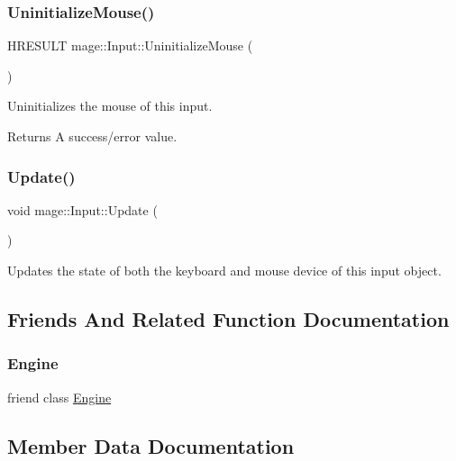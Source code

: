 \subsubsection{\texorpdfstring{Uninitialize\+Mouse()}{UninitializeMouse()}}
{\footnotesize\ttfamily H\+R\+E\+S\+U\+LT mage\+::\+Input\+::\+Uninitialize\+Mouse (\begin{DoxyParamCaption}{ }\end{DoxyParamCaption})\hspace{0.3cm}{\ttfamily [protected]}}

Uninitializes the mouse of this input.

\begin{DoxyReturn}{Returns}
A success/error value. 
\end{DoxyReturn}
\hypertarget{classmage_1_1_input_ab152509540c3f41d337296edc2aea660}{}\label{classmage_1_1_input_ab152509540c3f41d337296edc2aea660} 
\subsubsection{\texorpdfstring{Update()}{Update()}}
{\footnotesize\ttfamily void mage\+::\+Input\+::\+Update (\begin{DoxyParamCaption}{ }\end{DoxyParamCaption})\hspace{0.3cm}{\ttfamily [protected]}}

Updates the state of both the keyboard and mouse device of this input object. 

\subsection{Friends And Related Function Documentation}
\hypertarget{classmage_1_1_input_a3e1914489e4bed4f9f23cdeab34a43dc}{}\label{classmage_1_1_input_a3e1914489e4bed4f9f23cdeab34a43dc} 
\subsubsection{\texorpdfstring{Engine}{Engine}}
{\footnotesize\ttfamily friend class \hyperlink{classmage_1_1_engine}{Engine}\hspace{0.3cm}{\ttfamily [friend]}}



\subsection{Member Data Documentation}
\hypertarget{classmage_1_1_input_a6169d17f5a782039c7aefd0ffc5ba1bf}{}\label{classmage_1_1_input_a6169d17f5a782039c7aefd0ffc5ba1bf} 
